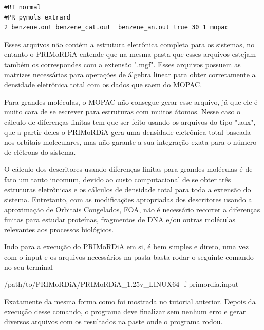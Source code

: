 \documentclass[a4paper,11pt]{refart}
\begin{document}
\hspace*{-\leftmarginwidth}
\begin{minipage}{\fullwidth}
\begin{lstlisting}[caption={Input editado para execução do tutorial 2},label={tut201}]
#RT normal
#PR pymols extrard
2 benzene.out benzene_cat.out  benzene_an.out true 30 1 mopac
\end{lstlisting}
\end{minipage}

Esses arquivos não contém a estrutura eletrônica completa para os sistemas, no entanto o PRIMoRDiA entende que na mesma pasta que esses arquivos estejam também os correspondes com a extensão ".mgf". Esses arquivos possuem as matrizes necessárias para operações de álgebra linear para obter corretamente a densidade eletrônica total com os dados que saem do MOPAC. 

Para grandes moléculas, o MOPAC não consegue gerar esse arquivo, já que ele é muito cara de se escrever para estruturas com muitos átomos. Nesse caso o cálculo de diferenças finitas tem que ser feito usando os arquivos do tipo ".aux", que a partir deles o PRIMoRDiA gera uma densidade eletrônica total baseada nos orbitais moleculares, mas não garante a sua integração exata para o número de elétrons do sistema. 

O cálculo dos descritores usando diferenças finitas para grandes moléculas é de fato um tanto incomum, devido ao custo computacional de se obter três estruturas eletrônicas e os cálculos de densidade total para toda a extensão do sistema. Entretanto, com as modificações apropriadas dos descritores usando a aproximação de Orbitais Congelados, FOA, não é necessário recorrer a diferenças finitas para estudar proteínas, fragmentos de DNA e/ou outras moléculas relevantes aos processos biológicos.  

Indo para a execução do PRIMoRDiA em si, é bem simples e direto, uma vez com o input e os arquivos necessários na pasta basta rodar o seguinte comando no seu terminal


\hspace*{-\leftmarginwidth}
\begin{minipage}{\fullwidth}
	\begin{commandshell}/path/to/PRIMoRDiA/PRIMoRDiA_1.25v_LINUX64 -f primordia.input\end{commandshell}
\end{minipage}

Exatamente da mesma forma como foi mostrada no tutorial anterior. Depois da execução desse comando, o programa deve finalizar sem nenhum erro e gerar diversos arquivos com os resultados na paste onde o programa rodou. 
\end{document}
